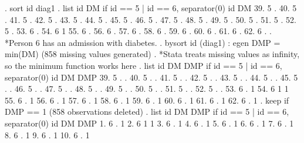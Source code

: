 . sort id diag1
{\smallskip}
. list id DM if id == 5 | id == 6, separator(0)
{\smallskip}
      {\TLC}
      {\VBAR} id   DM {\VBAR}
      {\LFTT}
  39. {\VBAR}  5    . {\VBAR}
  40. {\VBAR}  5    . {\VBAR}
  41. {\VBAR}  5    . {\VBAR}
  42. {\VBAR}  5    . {\VBAR}
  43. {\VBAR}  5    . {\VBAR}
  44. {\VBAR}  5    . {\VBAR}
  45. {\VBAR}  5    . {\VBAR}
  46. {\VBAR}  5    . {\VBAR}
  47. {\VBAR}  5    . {\VBAR}
  48. {\VBAR}  5    . {\VBAR}
  49. {\VBAR}  5    . {\VBAR}
  50. {\VBAR}  5    . {\VBAR}
  51. {\VBAR}  5    . {\VBAR}
  52. {\VBAR}  5    . {\VBAR}
  53. {\VBAR}  6    . {\VBAR}
  54. {\VBAR}  6    1 {\VBAR}
  55. {\VBAR}  6    . {\VBAR}
  56. {\VBAR}  6    . {\VBAR}
  57. {\VBAR}  6    . {\VBAR}
  58. {\VBAR}  6    . {\VBAR}
  59. {\VBAR}  6    . {\VBAR}
  60. {\VBAR}  6    . {\VBAR}
  61. {\VBAR}  6    . {\VBAR}
  62. {\VBAR}  6    . {\VBAR}
      {\BLC}
{\smallskip}
. *Person 6 has an admission with diabetes. 
. bysort id (diag1) : egen DMP = min(DM)
(858 missing values generated)
{\smallskip}
. *Stata treats missing values as infinity, so the minimum function works here
. list id DM DMP if id == 5 | id == 6, separator(0)
{\smallskip}
      {\TLC}
      {\VBAR} id   DM   DMP {\VBAR}
      {\LFTT}
  39. {\VBAR}  5    .     . {\VBAR}
  40. {\VBAR}  5    .     . {\VBAR}
  41. {\VBAR}  5    .     . {\VBAR}
  42. {\VBAR}  5    .     . {\VBAR}
  43. {\VBAR}  5    .     . {\VBAR}
  44. {\VBAR}  5    .     . {\VBAR}
  45. {\VBAR}  5    .     . {\VBAR}
  46. {\VBAR}  5    .     . {\VBAR}
  47. {\VBAR}  5    .     . {\VBAR}
  48. {\VBAR}  5    .     . {\VBAR}
  49. {\VBAR}  5    .     . {\VBAR}
  50. {\VBAR}  5    .     . {\VBAR}
  51. {\VBAR}  5    .     . {\VBAR}
  52. {\VBAR}  5    .     . {\VBAR}
  53. {\VBAR}  6    .     1 {\VBAR}
  54. {\VBAR}  6    1     1 {\VBAR}
  55. {\VBAR}  6    .     1 {\VBAR}
  56. {\VBAR}  6    .     1 {\VBAR}
  57. {\VBAR}  6    .     1 {\VBAR}
  58. {\VBAR}  6    .     1 {\VBAR}
  59. {\VBAR}  6    .     1 {\VBAR}
  60. {\VBAR}  6    .     1 {\VBAR}
  61. {\VBAR}  6    .     1 {\VBAR}
  62. {\VBAR}  6    .     1 {\VBAR}
      {\BLC}
{\smallskip}
. keep if DMP == 1
(858 observations deleted)
{\smallskip}
. list id DM DMP if id == 5 | id == 6, separator(0)
{\smallskip}
     {\TLC}
     {\VBAR} id   DM   DMP {\VBAR}
     {\LFTT}
  1. {\VBAR}  6    .     1 {\VBAR}
  2. {\VBAR}  6    1     1 {\VBAR}
  3. {\VBAR}  6    .     1 {\VBAR}
  4. {\VBAR}  6    .     1 {\VBAR}
  5. {\VBAR}  6    .     1 {\VBAR}
  6. {\VBAR}  6    .     1 {\VBAR}
  7. {\VBAR}  6    .     1 {\VBAR}
  8. {\VBAR}  6    .     1 {\VBAR}
  9. {\VBAR}  6    .     1 {\VBAR}
 10. {\VBAR}  6    .     1 {\VBAR}
     {\BLC}
{\smallskip}
